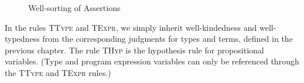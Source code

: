 \begin{figure}
\caption{Well-sorting of Assertions}
\label{logic-prop-ok}
\end{figure}

In the rules \textsc{TType} and \textsc{TExpr}, we simply inherit
well-kindedness and well-typedness from the corresponding judgments
for types and terms, defined in the previous chapter.  The rule
\textsc{THyp} is the hypothesis rule for propositional
variables. (Type and program expression variables can only be
referenced through the \textsc{TType} and \textsc{TExpr} rules.)


